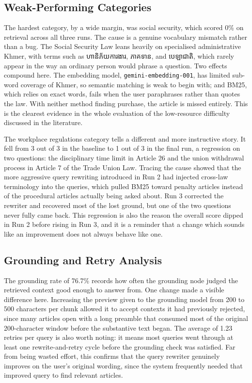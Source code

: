 \subsection{Weak-Performing Categories}

\hs The hardest category, by a wide margin, was social security, which scored 0\% on
retrieval across all three runs. The cause is a genuine vocabulary mismatch rather than a
bug. The Social Security Law leans heavily on specialised administrative Khmer, with terms
such as {\khmerfont ហានិភ័យការងារ}, {\khmerfont ភាគទាន}, and {\khmerfont បេឡាជាតិ}, which
rarely appear in the way an ordinary person would phrase a question. Two effects compound
here. The embedding model, \texttt{gemini-embedding-001}, has limited sub-word coverage of
Khmer, so semantic matching is weak to begin with; and BM25, which relies on exact words,
fails when the user paraphrases rather than quotes the law. With neither method finding
purchase, the article is missed entirely. This is the clearest evidence in the whole
evaluation of the low-resource difficulty discussed in the literature.

\hs The workplace regulations category tells a different and more instructive story. It
fell from 3 out of 3 in the baseline to 1 out of 3 in the final run, a regression on two
questions: the disciplinary time limit in Article 26 and the union withdrawal process in
Article 7 of the Trade Union Law. Tracing the cause showed that the more aggressive query
rewriting introduced in Run 2 had injected cross-law terminology into the queries, which
pulled BM25 toward penalty articles instead of the procedural articles actually being
asked about. Run 3 corrected the rewriter and recovered most of the lost ground, but one
of the two questions never fully came back. This regression is also the reason the overall
score dipped in Run 2 before rising in Run 3, and it is a reminder that a change which
sounds like an improvement does not always behave like one.

\subsection{Grounding and Retry Analysis}

\hs The grounding rate of 76.7\% records how often the grounding node judged the retrieved
context good enough to answer from. One change made a visible difference here. Increasing
the preview given to the grounding model from 200 to 500 characters per chunk allowed it
to accept contexts it had previously rejected, since many articles open with a long
preamble that consumed most of the original 200-character window before the substantive
text began. The average of 1.23 retries per query is also worth noting: it means most
queries went through at least one rewrite-and-retry cycle before the grounding check was
satisfied. Far from being wasted effort, this confirms that the query rewriter genuinely
improves on the user's original wording, since the system frequently needed that improved
query to find relevant articles.

